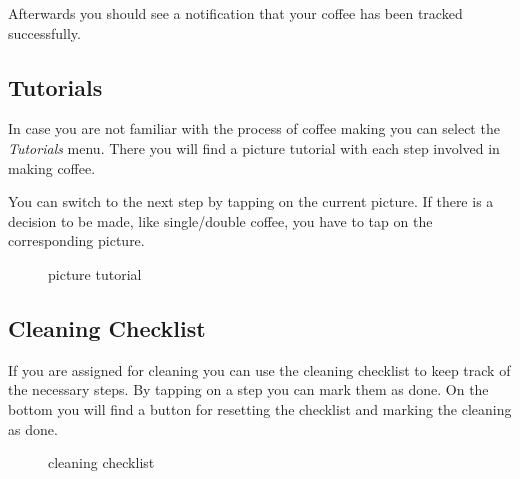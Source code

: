 Afterwards you should see a notification that your coffee has been
tracked successfully.

\subsection{Tutorials}\label{tutorials-1}

In case you are not familiar with the process of coffee making you can
select the \emph{Tutorials} menu. There you will find a picture tutorial
with each step involved in making coffee.

You can switch to the next step by tapping on the current picture. If
there is a decision to be made, like single/double coffee, you have to
tap on the corresponding picture.

\begin{figure}[htbp]
\centering
{}
\caption{picture tutorial}
\end{figure}

\subsection{Cleaning Checklist}\label{cleaning-checklist-1}

If you are assigned for cleaning you can use the cleaning checklist to
keep track of the necessary steps. By tapping on a step you can mark
them as done. On the bottom you will find a button for resetting the
checklist and marking the cleaning as done.

\begin{figure}[htbp]
\centering
{}
\caption{cleaning checklist}
\end{figure}


